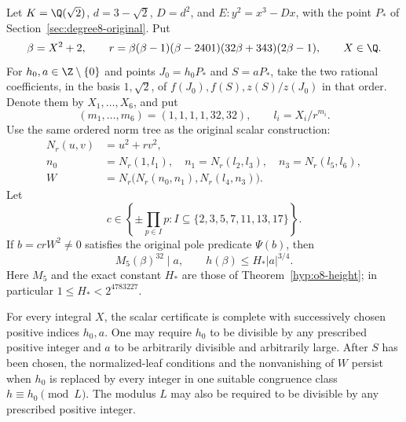\begin{lemma}
\label{v5:scalar32-bridge}
Let $K=\Q(\sqrt2)$, $d=3-\sqrt2$, $D=d^2$, and
$E:y^2=x^3-Dx$, with the point $P_*$ of
Section~\ref{sec:degree8-original}. Put
\[
 \beta=X^2+2,\qquad
 r=\beta(\beta-1)(\beta-2401)(32\beta+343)(2\beta-1),
 \qquad X\in\Q.
\]
For $h_0,a\in\Z\setminus\{0\}$ and points $J_0=h_0P_*$ and $S=aP_*$,
take the
two rational coefficients, in the basis $1,\sqrt2$, of
$f(J_0),f(S),z(S)/z(J_0)$ in that order. Denote them by
$X_1,\ldots,X_6$, and put
\[
 (m_1,\ldots,m_6)=(1,1,1,1,32,32),\qquad l_i=X_i/r^{m_i}.
\]
Use the same ordered norm tree as the original scalar construction:
\[
 \begin{split}
 N_r(u,v)&=u^2+rv^2,\\
 n_0&=N_r(1,l_1),\quad n_1=N_r(l_2,l_3),\quad
 n_3=N_r(l_5,l_6),\\
 W&=N_r\bigl(N_r(n_0,n_1),N_r(l_4,n_3)\bigr).
 \end{split}
\]
Let
\[
 c\in\left\{\pm\prod_{p\in I}p:
                   I\subseteq\{2,3,5,7,11,13,17\}\right\}.
\]
If $b=crW^2\ne0$ satisfies the original pole predicate $\Psi(b)$,
then
\[
 M_5(\beta)^{32}\mid a,\qquad
 h(\beta)\le H_*|a|^{3/4}.
\]
Here $M_5$ and the exact constant $H_*$ are those of
Theorem~\ref{hyp:o8-height}; in particular
$1\le H_*<2^{4783227}$.

For every integral $X$, the scalar certificate is complete with
successively chosen positive indices $h_0,a$. One may require $h_0$
to be divisible by any prescribed positive integer and $a$ to be
arbitrarily divisible and arbitrarily large. After $S$ has been chosen,
the normalized-leaf conditions and the nonvanishing of $W$ persist when
$h_0$ is replaced by every integer in one suitable congruence class
$h\equiv h_0\pmod L$. The modulus $L$ may also be required to be
divisible by any prescribed positive integer.
\end{lemma}

